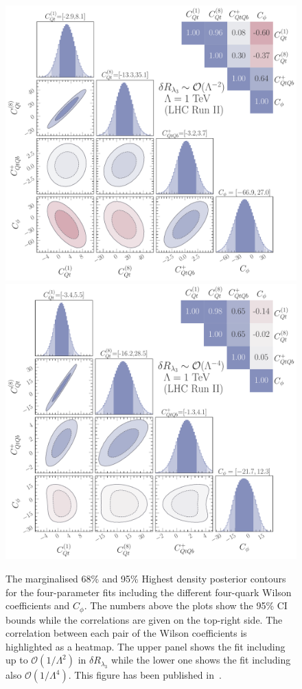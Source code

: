 	\begin{figure}[h!]
		\begin{center}
			\includegraphics[width=.6\linewidth]{fig/4param_fit_LHC_RunII_l3L_rge}\\
			\includegraphics[width=.6\linewidth]{fig/4param_fit_LHC_RunII_l3Q_rge}
		\end{center}
		\caption{The marginalised 68\% and 95\% Highest density posterior contours for the four-parameter fits including the different four-quark Wilson coefficients and $C_\phi$. The numbers above the plots show the 95\% CI bounds while the correlations are given on the top-right side. The correlation between each pair of the Wilson coefficients is highlighted as a heatmap.
			The upper panel shows the fit including up to $\mathcal{O}(1/\Lambda^2)$ in $\delta R_{\lambda_3}$  while the lower one shows the fit including also  $\mathcal{O}(1/\Lambda^4)$.  This figure has been published in~\cite{Alasfar:2022zyr}. \label{fig:4param} }
	\end{figure}
